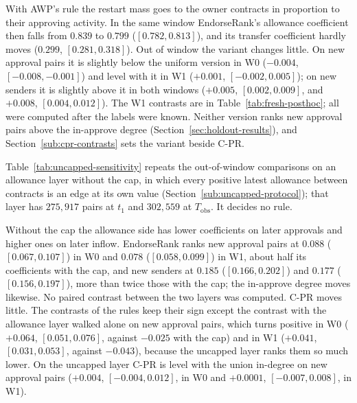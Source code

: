 

With AWP's rule the restart mass goes to the owner contracts in proportion to their approving activity. In the same window EndorseRank's allowance coefficient then falls from $0.839$ to $0.799$ ($[0.782,0.813]$), and its transfer coefficient hardly moves ($0.299$, $[0.281,0.318]$). Out of window the variant changes little. On new approval pairs it is slightly below the uniform version in W0 ($-0.004$, $[-0.008,-0.001]$) and level with it in W1 ($+0.001$, $[-0.002,0.005]$); on new senders it is slightly above it in both windows ($+0.005$, $[0.002,0.009]$, and $+0.008$, $[0.004,0.012]$). The W1 contrasts are in Table~\ref{tab:fresh-posthoc}; all were computed after the labels were known. Neither version ranks new approval pairs above the in-approve degree (Section~\ref{sec:holdout-results}), and Section~\ref{sub:cpr-contrasts} sets the variant beside \mbox{C-PR}.


Table~\ref{tab:uncapped-sensitivity} repeats the out-of-window comparisons on an allowance layer without the cap, in which every positive latest allowance between contracts is an edge at its own value (Section~\ref{sub:uncapped-protocol}); that layer has $275{,}917$ pairs at $t_1$ and $302{,}559$ at $T_{\mathrm{obs}}$. It decides no rule.



Without the cap the allowance side has lower coefficients on later approvals and higher ones on later inflow. EndorseRank ranks new approval pairs at $0.088$ ($[0.067,0.107]$) in W0 and $0.078$ ($[0.058,0.099]$) in W1, about half its coefficients with the cap, and new senders at $0.185$ ($[0.166,0.202]$) and $0.177$ ($[0.156,0.197]$), more than twice those with the cap; the in-approve degree moves likewise. No paired contrast between the two layers was computed. \mbox{C-PR} moves little. The contrasts of the rules keep their sign except the contrast with the allowance layer walked alone on new approval pairs, which turns positive in W0 ($+0.064$, $[0.051,0.076]$, against $-0.025$ with the cap) and in W1 ($+0.041$, $[0.031,0.053]$, against $-0.043$), because the uncapped layer ranks them so much lower. On the uncapped layer \mbox{C-PR} is level with the union in-degree on new approval pairs ($+0.004$, $[-0.004,0.012]$, in W0 and $+0.0001$, $[-0.007,0.008]$, in W1).

